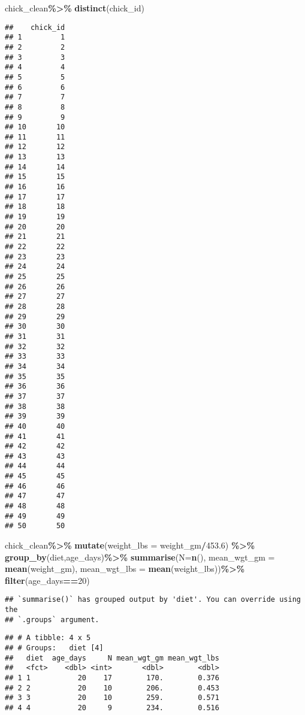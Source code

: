 \documentclass[
]{article}
\newenvironment{Shaded}{\begin{snugshade}}{\end{snugshade}}
\newcommand{\AttributeTok}[1]{\textcolor[rgb]{0.13,0.29,0.53}{#1}}
\newcommand{\DecValTok}[1]{\textcolor[rgb]{0.00,0.00,0.81}{#1}}
\newcommand{\FloatTok}[1]{\textcolor[rgb]{0.00,0.00,0.81}{#1}}
\newcommand{\FunctionTok}[1]{\textcolor[rgb]{0.13,0.29,0.53}{\textbf{#1}}}
\newcommand{\NormalTok}[1]{#1}
\newcommand{\SpecialCharTok}[1]{\textcolor[rgb]{0.81,0.36,0.00}{\textbf{#1}}}
\begin{document}
\begin{Shaded}
\begin{Highlighting}[]
\NormalTok{chick\_clean}\SpecialCharTok{\%\textgreater{}\%}
  \FunctionTok{distinct}\NormalTok{(chick\_id)}
\end{Highlighting}
\end{Shaded}

\begin{verbatim}
##    chick_id
## 1         1
## 2         2
## 3         3
## 4         4
## 5         5
## 6         6
## 7         7
## 8         8
## 9         9
## 10       10
## 11       11
## 12       12
## 13       13
## 14       14
## 15       15
## 16       16
## 17       17
## 18       18
## 19       19
## 20       20
## 21       21
## 22       22
## 23       23
## 24       24
## 25       25
## 26       26
## 27       27
## 28       28
## 29       29
## 30       30
## 31       31
## 32       32
## 33       33
## 34       34
## 35       35
## 36       36
## 37       37
## 38       38
## 39       39
## 40       40
## 41       41
## 42       42
## 43       43
## 44       44
## 45       45
## 46       46
## 47       47
## 48       48
## 49       49
## 50       50
\end{verbatim}

\begin{Shaded}
\begin{Highlighting}[]
\NormalTok{chick\_clean}\SpecialCharTok{\%\textgreater{}\%}
  \FunctionTok{mutate}\NormalTok{(}\AttributeTok{weight\_lbs =}\NormalTok{ weight\_gm}\SpecialCharTok{/}\FloatTok{453.6}\NormalTok{) }\SpecialCharTok{\%\textgreater{}\%}
  \FunctionTok{group\_by}\NormalTok{(diet,age\_days)}\SpecialCharTok{\%\textgreater{}\%}
  \FunctionTok{summarise}\NormalTok{(}\AttributeTok{N=}\FunctionTok{n}\NormalTok{(), }\AttributeTok{mean\_wgt\_gm =} \FunctionTok{mean}\NormalTok{(weight\_gm), }\AttributeTok{mean\_wgt\_lbs =} \FunctionTok{mean}\NormalTok{(weight\_lbs))}\SpecialCharTok{\%\textgreater{}\%}
  \FunctionTok{filter}\NormalTok{(age\_days}\SpecialCharTok{==}\DecValTok{20}\NormalTok{)}
\end{Highlighting}
\end{Shaded}

\begin{verbatim}
## `summarise()` has grouped output by 'diet'. You can override using the
## `.groups` argument.
\end{verbatim}

\begin{verbatim}
## # A tibble: 4 x 5
## # Groups:   diet [4]
##   diet  age_days     N mean_wgt_gm mean_wgt_lbs
##   <fct>    <dbl> <int>       <dbl>        <dbl>
## 1 1           20    17        170.        0.376
## 2 2           20    10        206.        0.453
## 3 3           20    10        259.        0.571
## 4 4           20     9        234.        0.516
\end{verbatim}
\end{document}
